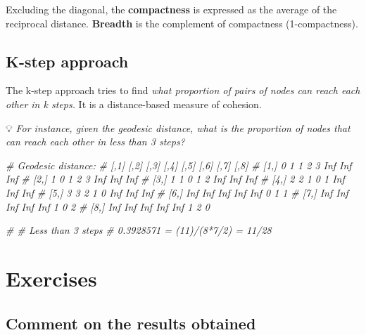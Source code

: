 \documentclass[
  notitlepage,
  onecolumn,
  openany]{book}
\newenvironment{Shaded}{\begin{snugshade}}{\end{snugshade}}
\newcommand{\CommentTok}[1]{\textcolor[rgb]{0.56,0.35,0.01}{\textit{#1}}}
\begin{document}
Excluding the diagonal, the \textbf{compactness} is expressed as the average of the reciprocal distance. \textbf{Breadth} is the complement of compactness (1-compactness).

\hypertarget{k-step-approach}{%
\subsection{K-step approach}\label{k-step-approach}}

The k-step approach tries to find \emph{what proportion of pairs of nodes can reach each other in k steps.} It is a distance-based measure of cohesion.

💡 \emph{For instance, given the geodesic distance, what is the proportion of nodes that can reach each other in less than 3 steps?}

\begin{Shaded}
\begin{Highlighting}[]
\CommentTok{\# Geodesic distance:}
\CommentTok{\# [,1] [,2] [,3] [,4] [,5] [,6] [,7] [,8]}
\CommentTok{\# [1,] 0 1 1 2 3 Inf Inf Inf}
\CommentTok{\# [2,] 1 0 1 2 3 Inf Inf Inf}
\CommentTok{\# [3,] 1 1 0 1 2 Inf Inf Inf}
\CommentTok{\# [4,] 2 2 1 0 1 Inf Inf Inf}
\CommentTok{\# [5,] 3 3 2 1 0 Inf Inf Inf}
\CommentTok{\# [6,] Inf Inf Inf Inf Inf 0 1 1}
\CommentTok{\# [7,] Inf Inf Inf Inf Inf 1 0 2}
\CommentTok{\# [8,] Inf Inf Inf Inf Inf 1 2 0}

\CommentTok{\# \# Less than 3 steps}
\CommentTok{\# 0.3928571 = (11)/(8*7/2) = 11/28}
\end{Highlighting}
\end{Shaded}

\hypertarget{exercises}{%
\section{Exercises}\label{exercises}}

\hypertarget{comment-on-the-results-obtained}{%
\subsection{Comment on the results obtained}\label{comment-on-the-results-obtained}}
\end{document}
